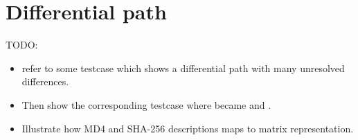 \section{Differential path}
\label{sec:dc-path}
%
TODO:
\begin{itemize}
  \item refer to some testcase which shows a differential path with many unresolved differences.
  \item Then show the corresponding testcase where  became \dnI{-} and .
  \item Illustrate how MD4 and SHA-256 descriptions maps to matrix representation.
\end{itemize}
